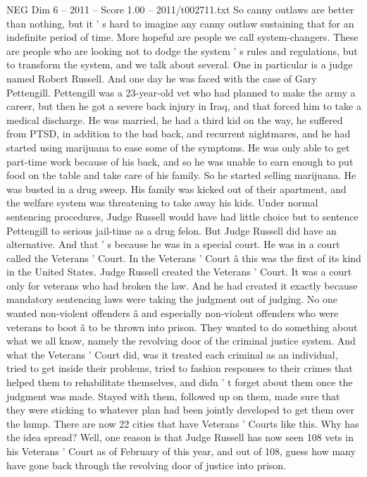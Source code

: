 \begin{textsample}{NEG Dim 6 – 2011 – Score 1.00 – 2011/t002711.txt}
So canny outlaws are better than nothing, but it ' s hard to imagine any canny outlaw sustaining that for an indefinite period of time.
More hopeful are people we call system-changers.
These are people who are looking not to dodge the system ' s rules and regulations, but to transform the system, and we talk about several.
One in particular is a judge named Robert Russell.
And one day he was faced with the case of Gary Pettengill.
Pettengill was a 23-year-old vet who had planned to make the army a career, but then he got a severe back injury in Iraq, and that forced him to take a medical discharge.
He was married, he had a third kid on the way, he suffered from PTSD, in addition to the bad back, and recurrent nightmares, and he had started using marijuana to ease some of the symptoms.
He was only able to get part-time work because of his back, and so he was unable to earn enough to put food on the table and take care of his family.
So he started selling marijuana.
He was busted in a drug sweep.
His family was kicked out of their apartment, and the welfare system was threatening to take away his kids.
Under normal sentencing procedures, Judge Russell would have had little choice but to sentence Pettengill to serious jail-time as a drug felon.
But Judge Russell did have an alternative.
And that ' s because he was in a special court.
He was in a court called the Veterans ' Court.
In the Veterans ' Court â this was the first of its kind in the United States.
Judge Russell created the Veterans ' Court.
It was a court only for veterans who had broken the law.
And he had created it exactly because mandatory sentencing laws were taking the judgment out of judging.
No one wanted non-violent offenders â and especially non-violent offenders who were veterans to boot â to be thrown into prison.
They wanted to do something about what we all know, namely the revolving door of the criminal justice system.
And what the Veterans ' Court did, was it treated each criminal as an individual, tried to get inside their problems, tried to fashion responses to their crimes that helped them to rehabilitate themselves, and didn ' t forget about them once the judgment was made.
Stayed with them, followed up on them, made sure that they were sticking to whatever plan had been jointly developed to get them over the hump.
There are now 22 cities that have Veterans ' Courts like this.
Why has the idea spread?
Well, one reason is that Judge Russell has now seen 108 vets in his Veterans ' Court as of February of this year, and out of 108, guess how many have gone back through the revolving door of justice into prison.

\end{textsample}
